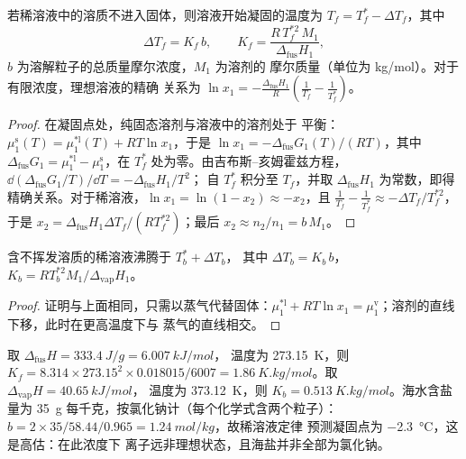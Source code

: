 \begin{theorem}[凝固点降低]\label{thm:b2:chemical-potential:cryoscopy}
若稀溶液中的溶质不进入固体，则溶液开始凝固的温度为
$T_f = T_f^* - \Delta T_f$，其中
\[
  \Delta T_f = K_f\,b, \qquad K_f = \frac{R\,T_f^{*2}\,M_1}{\Delta_{\text{fus}}H_1} ,
\]
$b$ 为溶解粒子的总质量摩尔浓度，$M_1$ 为溶剂的
摩尔质量（单位为 \unit{kg/mol}）。对于有限浓度，理想溶液的精确
关系为 $\ln x_1 = -\frac{\Delta_{\text{fus}}H_1}{R}
\left(\frac{1}{T_f} - \frac{1}{T_f^*}\right)$。
\end{theorem}

\begin{proof}
在凝固点处，纯固态溶剂与溶液中的溶剂处于
平衡：$\mu_1^{\text{s}}(T) = \mu_1^{*\text{l}}(T) + RT\ln x_1$，于是
$\ln x_1 = -\Delta_{\text{fus}}G_1(T)/(RT)$，其中 $\Delta_{\text{fus}}G_1 =
\mu_1^{*\text{l}} - \mu_1^{\text{s}}$，在 $T_f^*$ 处为零。由吉布斯–亥姆霍兹方程，
$\dd(\Delta_{\text{fus}}G_1/T)/\dd T = -\Delta_{\text{fus}}H_1/T^2$；
自 $T_f^*$ 积分至 $T_f$，并取 $\Delta_{\text{fus}}H_1$ 为常数，即得
精确关系。对于稀溶液，$\ln x_1 = \ln(1 - x_2) \approx
-x_2$，且 $\frac1{T_f} - \frac1{T_f^*} \approx -\Delta T_f/T_f^{*2}$，于是
$x_2 = \Delta_{\text{fus}}H_1\Delta T_f/(RT_f^{*2})$；最后 $x_2 \approx
n_2/n_1 = b\,M_1$。
\end{proof}

\begin{proposition}[沸点升高]\label{prop:b2:chemical-potential:ebullioscopy}
含不挥发溶质的稀溶液沸腾于 $T_b^* + \Delta T_b$，
其中 $\Delta T_b = K_b\,b$，$K_b = RT_b^{*2}M_1/\Delta_{\text{vap}}H_1$。
\end{proposition}

\begin{proof}
证明与上面相同，只需以蒸气代替固体：$\mu_1^{*\text{l}} +
RT\ln x_1 = \mu_1^{\text{v}}$；溶剂的直线下移，此时在更高温度下与
蒸气的直线相交。
\end{proof}

\begin{example}[水]\label{ex:b2:chemical-potential:water-constants}
取 $\Delta_{\text{fus}}H = \qty{333.4}{J/g} = \qty{6.007}{kJ/mol}$，
温度为 \qty{273.15}{K}，则 $K_f = 8.314 \times 273.15^2 \times 0.018015/6007 =
\qty{1.86}{K.kg/mol}$。取 $\Delta_{\text{vap}}H = \qty{40.65}{kJ/mol}$，
温度为 \qty{373.12}{K}，则 $K_b = \qty{0.513}{K.kg/mol}$。海水含盐量为 \qty{35}{g}
每千克，按氯化钠计（每个化学式含两个粒子）：
$b = 2 \times 35/58.44/0.965 = \qty{1.24}{mol/kg}$，故稀溶液定律
预测凝固点为 \qty{-2.3}{\celsius}，这是高估：在此浓度下
离子远非理想状态，且海盐并非全部为氯化钠。
\end{example}

